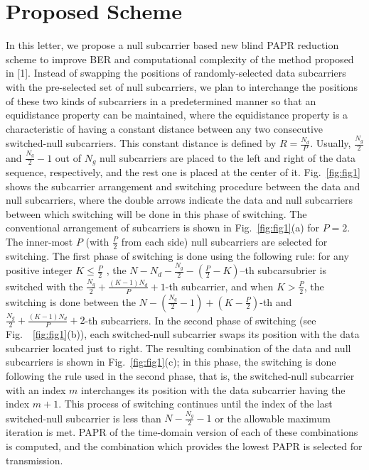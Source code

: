 \documentclass[journal,comsoc]{IEEEtran}
\begin{document}
\section{Proposed Scheme}
In this letter, we propose a null subcarrier based new blind PAPR reduction scheme to improve BER and computational complexity of the method proposed in [1]. Instead of swapping the positions of randomly-selected data subcarriers with the pre-selected set of null subcarriers, we plan to interchange the positions of these two kinds of subcarriers in a predetermined manner so that an equidistance property can be maintained, where the equidistance property is a characteristic of having a constant distance between any two consecutive switched-null subcarriers. This constant distance is defined by $R=\frac{N_d}{P}$. Usually, $\frac{N_g}{2}$  and $\frac{N_g}{2}-1$ out of $N_g$ null subcarriers are placed to the left and right of the data sequence, respectively, and the rest one is placed at the center of it. Fig.~\ref{fig:fig1} shows the subcarrier arrangement and switching procedure between the data and null subcarriers, where the double arrows indicate the data and null subcarriers between which switching will be done in this phase of switching. The conventional arrangement of subcarriers is shown in Fig.~\ref{fig:fig1}(a) for $P=2$. The inner-most $P$ (with $\frac{P}{2}$ from each side) null subcarriers are selected for switching. The first phase of switching is done using the following rule: for any positive integer  $K\leq \frac{P}{2}$ , the $N-N_d-\frac{N_g}{2}-(\frac{P}{2}-K)$–th subcarsubrier is switched with the $\frac{N_g}{2}+\frac{(K-1)N_d}{P}+1$-th subcarrier, and when $K>\frac{P}{2}$, the switching is done between the $N-(\frac{N_g}{2}-1)+(K-\frac{P}{2})$-th and $\frac{N_g}{2}+\frac{(K-1)N_d}{P}+2$-th subcarriers. In the second phase of switching (see Fig.~~\ref{fig:fig1}(b)), each switched-null subcarrier swaps its position with the data subcarrier located just to right. The resulting combination of the data and null subcarriers is shown in Fig.~\ref{fig:fig1}(c); in this phase, the switching is done following the rule used in the second phase, that is, the switched-null subcarrier with an index $m$ interchanges its position with the data subcarrier having the index $m+1$. This process of switching continues until the index of the last switched-null subcarrier is less than $N-\frac{N_g}{2}-1$ or the allowable maximum iteration is met. PAPR of the time-domain version of each of these combinations is computed, and the combination which provides the lowest PAPR is selected for transmission.
\end{document}
